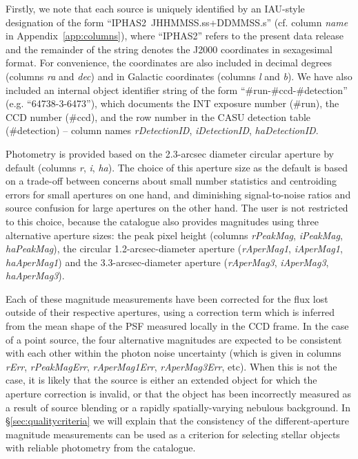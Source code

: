 \documentclass[useAMS,usenatbib]{mn2e}
\begin{document}
Firstly, we note that each source is uniquely identified by an
IAU-style designation of the form ``IPHAS2\ JHHMMSS.ss+DDMMSS.s''
(cf. column \emph{name} in Appendix~\ref{app:columns}),
where ``IPHAS2'' refers to the present
data release and the remainder of the string
denotes the J2000 coordinates in sexagesimal format.
For convenience, the coordinates
are also included in decimal degrees
(columns \emph{ra} and \emph{dec})
and in Galactic coordinates
(columns \emph{l} and \emph{b}).
We have also included an internal object identifier string 
of the form ``\#run-\#ccd-\#detection''
(e.g. ``64738-3-6473''),
which documents the INT exposure number (\#run),
the CCD number (\#ccd),
and the row number in the CASU detection table (\#detection)
-- column names \emph{rDetectionID},
\emph{iDetectionID}, \emph{haDetectionID}.

Photometry is provided based on the 2.3-arcsec diameter circular aperture
by default (columns \emph{r}, \emph{i}, \emph{ha}).
The choice of this aperture size as the default 
is based on a trade-off between concerns 
about small number statistics and centroiding errors
for small apertures on one hand,
and diminishing signal-to-noise ratios and source confusion
for large apertures on the other hand.
The user is not restricted to this choice, because
the catalogue also provides magnitudes
using three alternative aperture sizes:
the peak pixel height 
(columns \emph{rPeakMag}, \emph{iPeakMag}, \emph{haPeakMag}),
the circular 1.2-arcsec-diameter aperture 
(\emph{rAperMag1}, \emph{iAperMag1},
 \emph{haAperMag1}) and
the 3.3-arcsec-diameter aperture 
(\emph{rAperMag3}, \emph{iAperMag3},
 \emph{haAperMag3}).

Each of these magnitude measurements have been
corrected for the flux lost outside of their respective apertures,
using a correction term which is inferred from the
mean shape of the PSF measured locally in the CCD frame.
In the case of a point source,
the four alternative magnitudes are expected
to be consistent with each other
within the photon noise uncertainty
(which is given in columns \emph{rErr}, \emph{rPeakMagErr},
\emph{rAperMag1Err}, \emph{rAperMag3Err}, etc).
When this is not the case,
it is likely that the source is either
an extended object for which the aperture correction is invalid,
or that the object has been incorrectly measured as a result of
source blending or a rapidly spatially-varying nebulous background.
In \S\ref{sec:qualitycriteria} we will explain that the consistency
of the different-aperture magnitude measurements
can be used as a criterion for selecting stellar objects
with reliable photometry from the catalogue.
\end{document}

